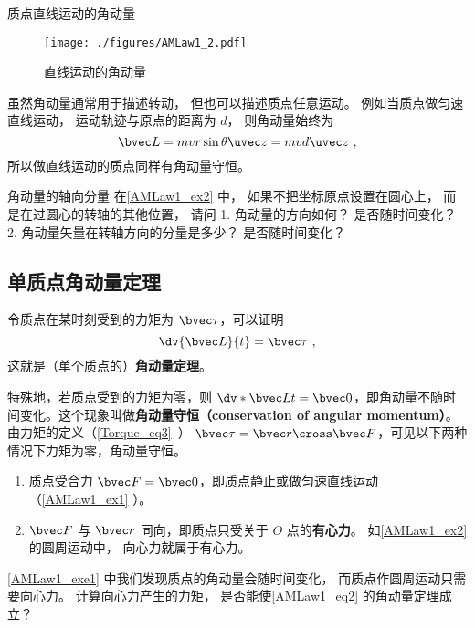 \begin{example}{质点直线运动的角动量}\label{AMLaw1_ex1}
\begin{figure}[ht]
\centering
\texttt{[image: ./figures/AMLaw1\_2.pdf]}
\caption{直线运动的角动量} \label{AMLaw1_fig2}
\end{figure}
虽然角动量通常用于描述转动， 但也可以描述质点任意运动。 例如当质点做匀速直线运动， 运动轨迹与原点的距离为 $d$， 则角动量始终为
\begin{equation}
\bvec L = mvr\sin\theta \uvec z =  mvd \uvec z~,
\end{equation}
所以做直线运动的质点同样有角动量守恒。
\end{example}

\begin{exercise}{角动量的轴向分量}\label{AMLaw1_exe1}
在\autoref{AMLaw1_ex2} 中， 如果不把坐标原点设置在圆心上， 而是在过圆心的转轴的其他位置， 请问 1. 角动量的方向如何？ 是否随时间变化？ 2. 角动量矢量在转轴方向的分量是多少？ 是否随时间变化？
\end{exercise}

\subsection{单质点角动量定理}
令质点在某时刻受到的力矩为 $\bvec \tau$，可以证明
\begin{equation}\label{AMLaw1_eq2}
\dv{\bvec L}{t} = \bvec \tau~,
\end{equation} 
这就是（单个质点的）\textbf{角动量定理}。

特殊地，若质点受到的力矩为零，则 $ \dv*{\bvec L}{t} = \bvec 0$，即角动量不随时间变化。这个现象叫做\textbf{角动量守恒（conservation of angular momentum）}。由力矩的定义（\autoref{Torque_eq3}~） $\bvec \tau = \bvec r \cross \bvec F$，可见以下两种情况下力矩为零，角动量守恒。
\begin{enumerate}
\item 质点受合力 $\bvec F= \bvec 0$，即质点静止或做匀速直线运动（\autoref{AMLaw1_ex1} ）。
\item $\bvec F$ 与 $\bvec r$ 同向，即质点只受关于 $O$ 点的\textbf{有心力}。 如\autoref{AMLaw1_ex2} 的圆周运动中， 向心力就属于有心力。
\end{enumerate}

\begin{exercise}{}
\autoref{AMLaw1_exe1} 中我们发现质点的角动量会随时间变化， 而质点作圆周运动只需要向心力。 计算向心力产生的力矩， 是否能使\autoref{AMLaw1_eq2} 的角动量定理成立？
\end{exercise}

